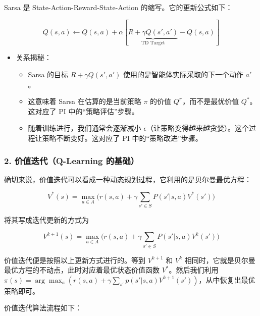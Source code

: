 Sarsa 是 State-Action-Reward-State-Action 的缩写。它的更新公式如下：

\[
Q(s,a)\leftarrow Q(s,a)+\alpha[\underbrace{R+\gamma Q(s',a')}_{\text{TD Target}}-Q(s,a)]
\]

\begin{itemize}
\tightlist
\item
  关系揭秘：

  \begin{itemize}
  \tightlist
  \item
    Sarsa 的目标 \(R+\gamma Q(s',a')\) 使用的是智能体实际采取的下一个动作 \(a'\)。
  \item
    这意味着 Sarsa 在估算的是当前策略 \(\pi\) 的价值 \(Q^{\pi}\)，而不是最优价值 \(Q^{*}\)。这对应了 PI 中的``策略评估''步骤。
  \item
    随着训练进行，我们通常会逐渐减小 \(\epsilon\)（让策略变得越来越贪婪）。这个过程让策略不断变好。这对应了 PI 中的``策略改进''步骤。
  \end{itemize}
\end{itemize}

\hypertarget{ux4ef7ux503cux8fedux4ee3q-learning-ux7684ux57faux7840}{%
\subsubsection{2. 价值迭代（Q-Learning 的基础）}\label{ux4ef7ux503cux8fedux4ee3q-learning-ux7684ux57faux7840}}

确切来说，价值迭代可以看成一种动态规划过程，它利用的是贝尔曼最优方程：

\[
V^{*}(s)=\max_{a\in A}\bigl(r(s,a)+\gamma\sum_{s'\in S}P(s'|s,a)V^{*}(s')\bigr)
\]

将其写成迭代更新的方式为

\[
V^{k+1}(s)=\max_{a\in A}\bigl(r(s,a)+\gamma\sum_{s'\in S}P(s'|s,a)V^{k}(s')\bigr)
\]

价值迭代便是按照以上更新方式进行的。等到 \(V^{k+1}\) 和 \(V^{k}\) 相同时，它就是贝尔曼最优方程的不动点，此时对应着最优状态价值函数 \(V^{*}\)。然后我们利用 \(\pi(s)=\arg\max_a(r(s,a)+\gamma\sum_{s'}p(s'|s,a)V^{k+1}(s'))\)，从中恢复出最优策略即可。

价值迭代算法流程如下：

